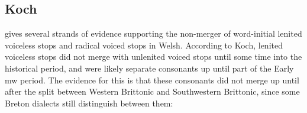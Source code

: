 

\subsection{Koch}
\label{kochvoiceless}
\Textcite{koch_*cothairche_1990} gives several strands of evidence supporting the non-merger of word-initial lenited voiceless stops and radical voiced stops in Welsh. According to Koch, lenited voiceless stops did not merge with unlenited voiced stops until some time into the historical period, and were likely separate consonants up until part of the Early \gls{mw} period. The evidence for this is that these consonants did not merge up until after the split between Western Brittonic and Southwestern Brittonic, since some Breton dialects still distinguish between them: 

